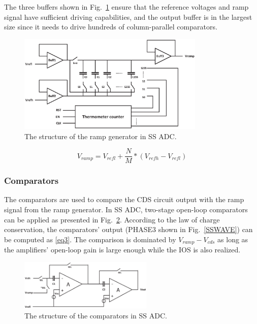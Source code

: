 The three buffers shown in Fig.~\ref{RAMP} ensure that the reference voltages and ramp signal have sufficient driving capabilities, 
and the output buffer is in the largest size since it needs to drive hundreds of column-parallel comparators.

\begin{figure}[htbp]
	\centerline{\includegraphics[width=3.5in]{./Figures/RAMP.eps}}
	\caption{The structure of the ramp generator in SS ADC.}
	\label{RAMP}
\end{figure} 

\begin{equation}
	V_{ramp}=V_{refl}+\frac{N}{M}\ast\left(V_{refh}-V_{refl}\right)
	\label{eq2}
\end{equation}

\subsubsection{Comparators}

The comparators are used to compare the CDS circuit output with the ramp signal from the ramp generator. 
In SS ADC, two-stage open-loop comparators can be applied as presented in Fig.~\ref{COM}. According to the law of charge conservation, 
the comparators’ output (PHASE3 shown in Fig.~\ref{SSWAVE}) can be computed as \eqref{eq3}. The comparison is dominated by $V_{ramp}-V_{cds}$ as long as the amplifiers’ open-loop gain 
is large enough while the IOS is also realized.%

\begin{figure}[htbp]
	\centerline{\includegraphics[width=2.5in]{./Figures/COM.eps}}
	\caption{The structure of the comparators in SS ADC.}
	\label{COM}
\end{figure} 


